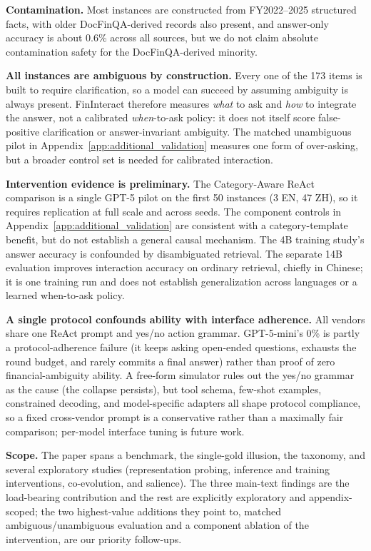 \textbf{Contamination.}
Most instances are constructed from FY2022--2025 structured facts, with older DocFinQA-derived records also present, and
answer-only accuracy is about 0.6\% across all sources, but we do not claim
absolute contamination safety for the DocFinQA-derived minority.

\textbf{All instances are ambiguous by construction.} Every one of the 173 items is built to
require clarification, so a model can succeed by assuming ambiguity is always present.
FinInteract therefore measures \emph{what} to ask and \emph{how} to integrate the answer, not a
calibrated \emph{when}-to-ask policy: it does not itself score false-positive clarification or answer-invariant ambiguity. The matched unambiguous pilot in Appendix~\ref{app:additional_validation} measures one form of over-asking, but a broader control set is needed for calibrated interaction.

\textbf{Intervention evidence is preliminary.} The Category-Aware ReAct comparison is a single GPT-5 pilot on the first 50 instances (3 EN, 47 ZH), so it requires replication at full scale and across seeds. The component controls in Appendix~\ref{app:additional_validation} are consistent with a category-template benefit, but do not establish a general causal mechanism. The 4B training study's answer accuracy is confounded by disambiguated retrieval. The separate 14B evaluation improves interaction accuracy on ordinary retrieval, chiefly in Chinese; it is one training run and does not establish generalization across languages or a learned when-to-ask policy.

\textbf{A single protocol confounds ability with interface adherence.} All vendors share one
ReAct prompt and yes/no action grammar. GPT-5-mini's 0\% is partly a protocol-adherence failure
(it keeps asking open-ended questions, exhausts the round budget, and rarely commits a final
answer) rather than proof of zero financial-ambiguity ability. A free-form simulator rules out
the yes/no grammar as the cause (the collapse persists), but tool schema, few-shot examples,
constrained decoding, and model-specific adapters all shape protocol compliance, so a fixed
cross-vendor prompt is a conservative rather than a maximally fair comparison; per-model interface
tuning is future work.

\textbf{Scope.} The paper spans a benchmark, the single-gold illusion, the taxonomy, and several
exploratory studies (representation probing, inference and training interventions, co-evolution,
and salience). The three main-text findings are the load-bearing contribution and the rest are
explicitly exploratory and appendix-scoped; the two highest-value additions they point to,
matched ambiguous/unambiguous evaluation and a component ablation of the intervention, are our
priority follow-ups.

